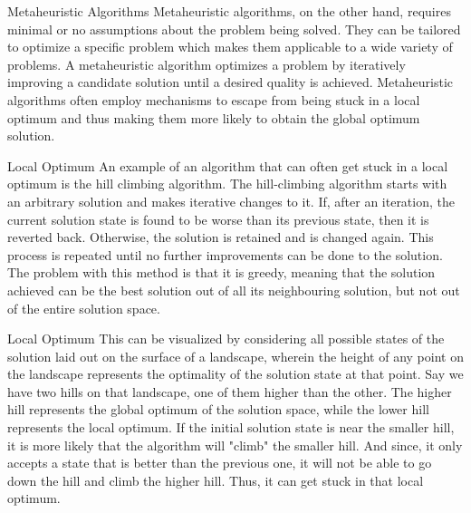 \documentclass{beamer}
\begin{document}
\begin{frame}{Metaheuristic Algorithms}
Metaheuristic algorithms, on the other hand, requires minimal or no assumptions about the problem being solved. They can be tailored to optimize a specific problem which makes them applicable to a wide variety of problems. A metaheuristic algorithm optimizes a problem by iteratively improving a candidate solution until a desired quality is achieved. Metaheuristic algorithms often employ mechanisms to escape from being stuck in a local optimum and thus making them more likely to obtain the global optimum solution.
\end{frame}

\begin{frame}{Local Optimum}
An example of an algorithm that can often get stuck in a local optimum is the hill climbing algorithm. The hill-climbing algorithm starts with an arbitrary solution and makes iterative changes to it. If, after an iteration, the current solution state is found to be worse than its previous state, then it is reverted back. Otherwise, the solution is retained and is changed again. This process is repeated until no further improvements can be done to the solution. The problem with this method is that it is greedy, meaning that the solution achieved can be the best solution out of all its neighbouring solution, but not out of the entire solution space. 
\end{frame}
\begin{frame}{Local Optimum}
This can be visualized by considering all possible states of the solution laid out on the surface of a landscape, wherein the height of any point on the landscape represents the optimality of the solution state at that point. Say we have two hills on that landscape, one of them higher than the other. The higher hill represents the global optimum of the solution space, while the lower hill represents the local optimum. If the initial solution state is near the smaller hill, it is more likely that the algorithm will "climb" the smaller hill. And since, it only accepts a state that is better than the previous one, it will not be able to go down the hill and climb the higher hill. Thus, it can get stuck in that local optimum. 
\end{frame}
\end{document}
